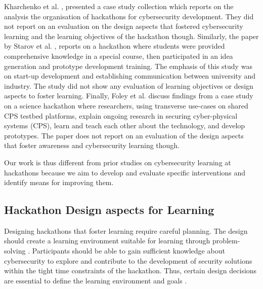 \documentclass[runningheads]{llncs}
\begin{document}
Kharchenko et al. \cite{kharchenko2016university}, presented a case study collection which reports on the analysis the organisation of hackathons for cybersecurity development. %
They did not report on an evaluation on the design aspects that fostered cybersecurity learning and the learning objectives of the hackathon though. Similarly, the paper by Starov et al. \cite{starov2015hacking}, reports on a hackathon where students were provided comprehensive knowledge in a special course, then participated in an idea generation and prototype development training. %
The emphasis of this study was on start-up development and establishing communication between university and industry. The study did not show any evaluation of learning objectives or design aspects to foster learning. Finally, Foley et al. \cite{foley2018science} discuss findings from a case study on a science hackathon where researchers, using transverse use-cases on shared CPS testbed platforms, explain ongoing research in securing cyber-physical systems (CPS), learn and teach each other about the technology, and develop prototypes. %
The paper does not report on an evaluation of the design aspects that foster awareness and cybersecurity learning though.

Our work is thus different from prior studies on cybersecurity learning at hackathons because we aim to develop and evaluate specific interventions and identify means for improving them.

\subsection{Hackathon Design aspects for Learning}\label{Sec:designaspects}
Designing hackathons that foster learning require careful planning. The design should create a learning environment suitable for learning through problem-solving \cite{case2004between}. Participants should be able to gain sufficient knowledge about cybersecurity to explore and contribute to the development of security solutions within the tight time constraints of the hackathon. Thus, certain design decisions are essential to define the learning environment and goals \cite{kollwitz2019hack}. 
\end{document}
